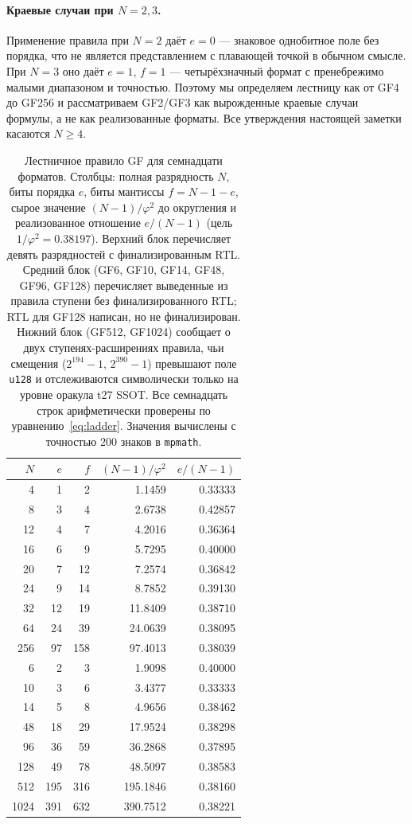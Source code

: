 \documentclass[11pt,a4paper]{article}
\theoremstyle{plain}
\begin{document}
\paragraph{Краевые случаи при \(N = 2,3\).}
Применение правила при \(N = 2\) даёт \(e = 0\) --- знаковое однобитное поле без
порядка, что не является представлением с плавающей точкой в обычном смысле.
При \(N = 3\) оно даёт \(e = 1\), \(f = 1\) --- четырёхзначный формат с
пренебрежимо малыми диапазоном и точностью. Поэтому мы определяем лестницу как
от GF4 до GF256 и рассматриваем GF2/GF3 как вырожденные краевые случаи формулы,
а не как реализованные форматы. Все утверждения настоящей заметки касаются
\(N \ge 4\).

\begin{table}[t]
\centering
\caption{Лестничное правило GF для семнадцати форматов. Столбцы: полная
разрядность \(N\), биты порядка \(e\), биты мантиссы \(f = N-1-e\), сырое
значение \((N-1)/\varphi^{2}\) до округления и реализованное отношение
\(e/(N-1)\) (цель \(1/\varphi^{2} = 0.38197\)). Верхний блок перечисляет девять
разрядностей с финализированным RTL. Средний блок
(GF6, GF10, GF14, GF48, GF96, GF128) перечисляет выведенные из правила ступени
без финализированного RTL; RTL для GF128 написан, но не финализирован. Нижний блок (GF512, GF1024) сообщает о двух ступенях-расширениях
правила, чьи смещения (\(2^{194}-1\), \(2^{390}-1\)) превышают поле
\texttt{u128} и отслеживаются символически
только на уровне оракула t27 SSOT. Все семнадцать строк арифметически проверены
по уравнению~\eqref{eq:ladder}. Значения вычислены с точностью 200 знаков в
\texttt{mpmath}.}
\label{tab:ladder}
\begin{tabular}{rrrrr}
\toprule
$N$ & $e$ & $f$ & $(N-1)/\varphi^{2}$ & $e/(N-1)$ \\
\midrule
4    & 1   & 2   & 1.1459   & 0.33333 \\
8    & 3   & 4   & 2.6738   & 0.42857 \\
12   & 4   & 7   & 4.2016   & 0.36364 \\
16   & 6   & 9   & 5.7295   & 0.40000 \\
20   & 7   & 12  & 7.2574   & 0.36842 \\
24   & 9   & 14  & 8.7852   & 0.39130 \\
32   & 12  & 19  & 11.8409  & 0.38710 \\
64   & 24  & 39  & 24.0639  & 0.38095 \\
256  & 97  & 158 & 97.4013  & 0.38039 \\
\midrule
6    & 2   & 3   & 1.9098   & 0.40000 \\
10   & 3   & 6   & 3.4377   & 0.33333 \\
14   & 5   & 8   & 4.9656   & 0.38462 \\
48   & 18  & 29  & 17.9524  & 0.38298 \\
96   & 36  & 59  & 36.2868  & 0.37895 \\
128  & 49  & 78  & 48.5097  & 0.38583 \\
\midrule
512  & 195 & 316 & 195.1846 & 0.38160 \\
1024 & 391 & 632 & 390.7512 & 0.38221 \\
\bottomrule
\end{tabular}
\end{table}
\end{document}
